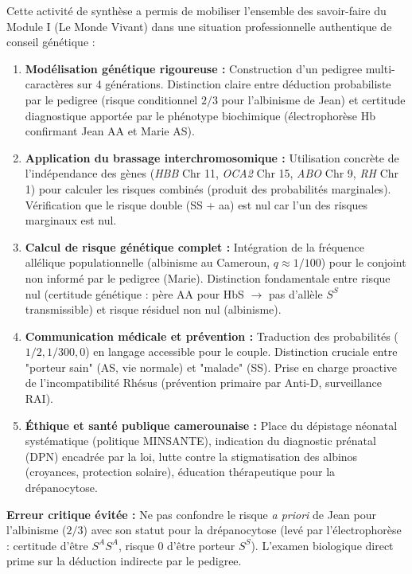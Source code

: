 \documentclass[11pt]{article}
\newcounter{popsec}
\newcounter{popsub}
\newcommand{\courssub}[1]{%
  \stepcounter{popsub}%
  \par\vspace{9pt}\noindent{\popxbold\fontsize{11.5}{13}\selectfont\color{popink}{\color{poporange}\thepopsec.\thepopsub}\hspace{6pt}#1}\par\nopagebreak\vspace{4pt}
}
\begin{document}
\courssub{Bilan de l'activité}
\begin{aretenir}
Cette activité de synthèse a permis de mobiliser l'ensemble des savoir-faire du Module I (Le Monde Vivant) dans une situation professionnelle authentique de conseil génétique :
\begin{enumerate}
    \item \textbf{Modélisation génétique rigoureuse :} Construction d'un pedigree multi-caractères sur 4 générations. Distinction claire entre déduction probabiliste par le pedigree (risque conditionnel $2/3$ pour l'albinisme de Jean) et certitude diagnostique apportée par le phénotype biochimique (électrophorèse Hb confirmant Jean AA et Marie AS).
    \item \textbf{Application du brassage interchromosomique :} Utilisation concrète de l'indépendance des gènes (\emph{HBB} Chr 11, \emph{OCA2} Chr 15, \emph{ABO} Chr 9, \emph{RH} Chr 1) pour calculer les risques combinés (produit des probabilités marginales). Vérification que le risque double (SS + aa) est nul car l'un des risques marginaux est nul.
    \item \textbf{Calcul de risque génétique complet :} Intégration de la fréquence allélique populationnelle (albinisme au Cameroun, $q \approx 1/100$) pour le conjoint non informé par le pedigree (Marie). Distinction fondamentale entre risque nul (certitude génétique : père AA pour HbS $\rightarrow$ pas d'allèle $S^S$ transmissible) et risque résiduel non nul (albinisme).
    \item \textbf{Communication médicale et prévention :} Traduction des probabilités ($1/2, 1/300, 0$) en langage accessible pour le couple. Distinction cruciale entre "porteur sain" (AS, vie normale) et "malade" (SS). Prise en charge proactive de l'incompatibilité Rhésus (prévention primaire par Anti-D, surveillance RAI).
    \item \textbf{Éthique et santé publique camerounaise :} Place du dépistage néonatal systématique (politique MINSANTE), indication du diagnostic prénatal (DPN) encadrée par la loi, lutte contre la stigmatisation des albinos (croyances, protection solaire), éducation thérapeutique pour la drépanocytose.
\end{enumerate}
\textbf{Erreur critique évitée :} Ne pas confondre le risque \emph{a priori} de Jean pour l'albinisme ($2/3$) avec son statut pour la drépanocytose (levé par l'électrophorèse : certitude d'être $S^A S^A$, risque 0 d'être porteur $S^S$). L'examen biologique direct prime sur la déduction indirecte par le pedigree.
\end{aretenir}
\end{document}
